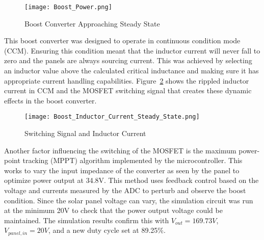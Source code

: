 \begin{figure}
\centering
\texttt{[image: Boost\_Power.png]}
\caption{Boost Converter Approaching Steady State}
\label{Figure B}
\end{figure}

This boost converter was designed to operate in continuous condition mode (CCM). Ensuring this condition meant that the inductor current will  never fall to zero and the panels are always sourcing current. This was achieved by selecting an inductor value above the calculated critical inductance and making sure it has appropriate current handling capabilities. Figure~\ref{Figure c} shows the rippled inductor current in CCM and the MOSFET switching signal that creates these dynamic effects in the boost converter. 

\begin{figure}
\centering
\texttt{[image: Boost\_Inductor\_Current\_Steady\_State.png]}
\caption{Switching Signal and Inductor Current}
\label{Figure c}
\end{figure}

Another factor influencing the switching of the MOSFET is the maximum power-point tracking (MPPT) algorithm implemented by the microcontroller. This works to vary the input impedance of the converter as seen by the panel to optimize power output at 34.8V. This method uses feedback control based on the voltage and currents measured by the ADC to perturb and observe the boost condition. Since the solar panel voltage can vary, the simulation circuit was run at the minimum 20V to check that the power output voltage could be maintained. The simulation results confirm this with $V_{out}=169.73V$, $V_{panel,in}=20V$, and a new duty cycle set at 89.25\%. 

